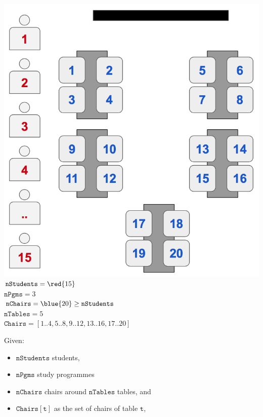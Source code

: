 \documentclass{cons-beamer}
\begin{document}
\begin{frame}[t]\label{studSeat}
  \begin{example}
    \begin{minipage}[c]{0.33\linewidth}
      \includegraphics[width=\linewidth]{images/ssp} \\
      \tiny
      $\mathtt{nStudents} = \red{15}$ \\ $\mathtt{nPgms} = 3$ \\
      $\mathtt{nChairs} = \blue{20} \geq \mathtt{nStudents}$ \\
      $\mathtt{nTables} = 5$ \\
      $\mathtt{Chairs} = [1..4,5..8,9..12,13..16,17..20]$
    \end{minipage}
    \hfill
    \begin{minipage}[c]{0.66\linewidth}
      Given:
      \begin{itemize}
        \item $\mathtt{nStudents}$ students,
        \item $\mathtt{nPgms}$ study programmes
        \item $\mathtt{nChairs}$ chairs around $\mathtt{nTables}$ tables, and
        \item $\mathtt{Chairs[t]}$ as the set of chairs of table $\mathtt{t}$,
      \end{itemize}
      \vfill


\end{minipage}
\end{example}
\end{frame}
\end{document}
